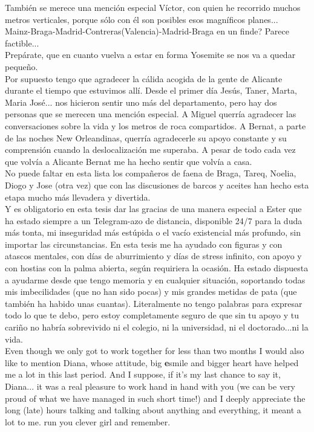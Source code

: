 También se merece una mención especial Víctor, con quien he recorrido muchos metros verticales, porque sólo con él son posibles esos magníficos planes...\\
Mainz-Braga-Madrid-Contreras(Valencia)-Madrid-Braga en un finde? Parece factible...\\
Prepárate, que en cuanto vuelva a estar en forma Yosemite se nos va a quedar pequeño.\\


Por supuesto tengo que agradecer la cálida acogida de la gente de Alicante durante el tiempo que estuvimos allí. Desde el primer día Jesús, Taner, Marta, Maria José... nos hicieron sentir uno más del departamento, pero hay dos personas que se merecen una mención especial. A Miguel querría agradecer las conversaciones sobre la vida y los metros de roca compartidos. A Bernat, a parte de las noches New Orleandinas, querría agradecerle su apoyo constante y su comprensión cuando la deslocalización me superaba. A pesar de todo cada vez que volvía a Alicante Bernat me ha hecho sentir que volvía a casa.\\

No puede faltar en esta lista los compañeros de faena de Braga, Tareq, Noelia, Diogo y Jose (otra vez) que con las discusiones de barcos y aceites han hecho esta etapa mucho más llevadera y divertida.\\


Y es obligatorio en esta tesis dar las gracias de una manera especial a Ester que ha estado siempre a un Telegram-azo de distancia, disponible 24/7 para la duda más tonta, mi inseguridad más estúpida o el vacío existencial más profundo, sin importar las circunstancias. En esta tesis me ha ayudado con figuras y con atascos mentales, con días de aburrimiento y días de stress infinito, con apoyo y con hostias con la palma abierta, según requiriera la ocasión.
Ha estado dispuesta a ayudarme desde que tengo memoria y en cualquier situación, soportando todas mis imbecilidades (que no han sido pocas) y mis grandes metidas de pata (que también ha habido unas cuantas).
Literalmente no tengo palabras para expresar todo lo que te debo, pero estoy completamente seguro de que sin tu apoyo y tu cariño no habría sobrevivido ni el colegio, ni la universidad, ni el doctorado...ni la vida.\\


Even though we only got to work together for less than two months I would also like to mention Diana, whose attitude, big {\bf e}smile and bigger heart have helped me a lot in this last period.
And I suppose, if it's my last chance to say it, Diana... it was a real pleasure to work hand in hand with you (we can be very proud of what we have managed in such short time!) and I deeply appreciate the long (late) hours talking and talking about anything and everything, it meant a lot to me.
run you clever girl and remember.\\





